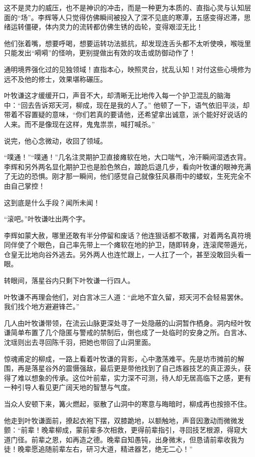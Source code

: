 这不是灵力的威压，也不是神识的冲击，而是一种更为本质的、直指心灵与认知层面的“场”。李辉等人只觉得仿佛瞬间被投入了深不见底的寒潭，五感变得迟滞，思绪运转僵硬，体内灵力的流转都仿佛生锈的齿轮，变得艰涩无比！

他们张着嘴，想要呼喝，想要运转功法抵抗，却发现连舌头都不太听使唤，喉咙里只能发出“嗬嗬”的怪响，更别提做出有效的攻击或防御动作了！

通明境界强化过的见独领域！直指本心，映照灵台，扰乱认知！对付这些心境修为远不及他的修士，效果堪称碾压。

叶牧谦这才缓缓开口，声音不大，却清晰无比地传入每一个护卫混乱的脑海中：“回去告诉郑天河，柳成，现在是我的人了。” 他顿了一下，语气依旧平淡，却带着不容置疑的意味，“你们若真的要请他，还希望拿出诚意，派个能好好说话的人来。而不是像现在这样，鬼鬼祟祟，喊打喊杀。”

说完，他心念微动，收回了领域。

“噗通！”“噗通！”几名注灵期护卫直接瘫软在地，大口喘气，冷汗瞬间湿透衣背。李辉和另外两名显化期护卫也是脸色煞白，踉跄后退几步，看向叶牧谦的眼神充满了无边的恐惧。刚才那一瞬间，他们感觉自己就像狂风暴雨中的蝼蚁，生死完全不由自己掌控！

这到底是什么手段？闻所未闻！

“滚吧。”叶牧谦吐出两个字。

李辉如蒙大赦，哪里还敢有半分停留和废话？他连狠话都不敢撂，对着两名真符境同伴使了个眼色，自己率先带上一个瘫软在地的护卫，随即转身，连滚爬带遁光，仓皇无比地向谷外逃去。另外两人也连忙跟上，一人扛了一个，甚至没敢回头看一眼。

\vspace{2em}

转眼间，落星谷内只剩下叶牧谦一行四人。

叶牧谦不再理会他们，对白言冰三人道：“此地不宜久留，郑天河不会轻易罢休。我们找个地方避避锋芒。”

几人由叶牧谦带领，在流云山脉更深处寻了一处隐蔽的山洞暂作栖身。洞内经叶牧谦简单布置了几个隐匿与警戒的禁制后，倒也成了一处临时的安身之所。白言冰、沈瑶则出去寻回陈千羽，把她也带回了山洞里面。

惊魂甫定的柳成，一路上看着叶牧谦的背影，心中激荡难平。先是坊市摊前的解围，再是落星谷外的震慑强敌，最后更是带他找到了自己炼器技艺的真正源头，获得了难以想象的传承。这位叶前辈，实力深不可测，待人却无居高临下之感，更有一种引导人看见更广阔天地的智慧与气度。

当众人安顿下来，篝火燃起，驱散了山洞中的寒意与晦暗时，柳成再也按捺不住。

他走到叶牧谦面前，撩起衣袍下摆，双膝跪地，以额触地，声音因激动而微微发颤：“前辈！晚辈柳成，蒙前辈多次相救，更得前辈指引，寻回技艺根源，得窥大道门径。前辈之恩，如再造之德。晚辈自知愚钝，出身微末，但恳请前辈收我为徒！晚辈愿追随前辈左右，研习大道，精进器艺，绝无二心！”

